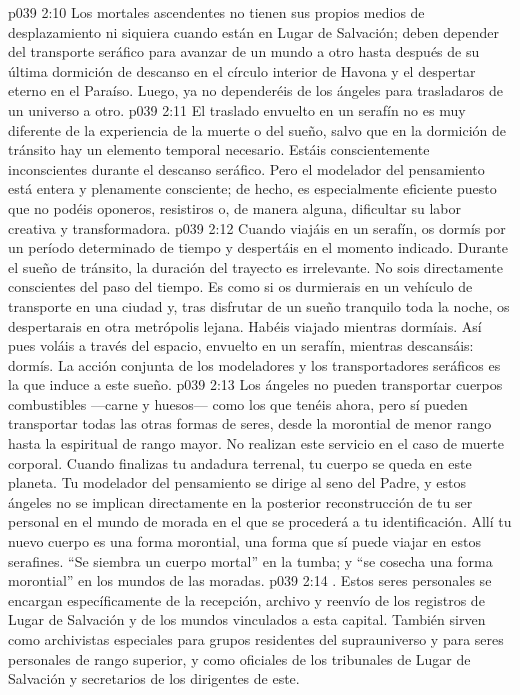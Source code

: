 \vs p039 2:10 \pc Los mortales ascendentes no tienen sus propios medios de desplazamiento ni siquiera cuando están en Lugar de Salvación; deben depender del transporte seráfico para avanzar de un mundo a otro hasta después de su última dormición de descanso en el círculo interior de Havona y el despertar eterno en el Paraíso. Luego, ya no dependeréis de los ángeles para trasladaros de un universo a otro.
\vs p039 2:11 El traslado envuelto en un serafín no es muy diferente de la experiencia de la muerte o del sueño, salvo que en la dormición de tránsito hay un elemento temporal necesario. Estáis conscientemente inconscientes durante el descanso seráfico. Pero el modelador del pensamiento está entera y plenamente consciente; de hecho, es especialmente eficiente puesto que no podéis oponeros, resistiros o, de manera alguna, dificultar su labor creativa y transformadora.
\vs p039 2:12 Cuando viajáis en un serafín, os dormís por un período determinado de tiempo y despertáis en el momento indicado. Durante el sueño de tránsito, la duración del trayecto es irrelevante. No sois directamente conscientes del paso del tiempo. Es como si os durmierais en un vehículo de transporte en una ciudad y, tras disfrutar de un sueño tranquilo toda la noche, os despertarais en otra metrópolis lejana. Habéis viajado mientras dormíais. Así pues voláis a través del espacio, envuelto en un serafín, mientras descansáis: dormís. La acción conjunta de los modeladores y los transportadores seráficos es la que induce a este sueño.
\vs p039 2:13 \pc Los ángeles no pueden transportar cuerpos combustibles ---carne y huesos--- como los que tenéis ahora, pero sí pueden transportar todas las otras formas de seres, desde la morontial de menor rango hasta la espiritual de rango mayor. No realizan este servicio en el caso de muerte corporal. Cuando finalizas tu andadura terrenal, tu cuerpo se queda en este planeta. Tu modelador del pensamiento se dirige al seno del Padre, y estos ángeles no se implican directamente en la posterior reconstrucción de tu ser personal en el mundo de morada en el que se procederá a tu identificación. Allí tu nuevo cuerpo es una forma morontial, una forma que sí puede viajar en estos serafines. “Se siembra un cuerpo mortal” en la tumba; y “se cosecha una forma morontial” en los mundos de las moradas.
\vs p039 2:14 . Estos seres personales se encargan específicamente de la recepción, archivo y reenvío de los registros de Lugar de Salvación y de los mundos vinculados a esta capital. También sirven como archivistas especiales para grupos residentes del suprauniverso y para seres personales de rango superior, y como oficiales de los tribunales de Lugar de Salvación y secretarios de los dirigentes de este.
